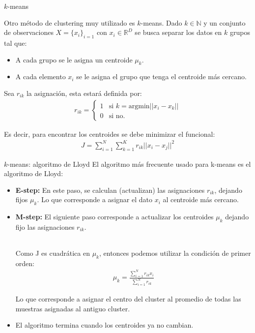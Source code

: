 \documentclass[9pt]{beamer}
\begin{document}
\begin{frame}{$k$-means}

Otro método de clustering muy utilizado es $k$-means. Dado $k \in \mathbb{N}$ y un conjunto de observaciones $X = \{x_i\}_{i=1}$ con $x_i\in \mathbb{R}^D$ se busca separar los datos en $k$ grupos tal que:

\begin{itemize}
	\item A cada grupo se le asigna un centroide $\mu_k$.\pause
	\item A cada elemento $x_i$ se le asigna el grupo que tenga el centroide más cercano.\pause
\end{itemize}

Sea $r_{ik}$ la asignación, esta estará definida por:
\begin{align*}
r_{ik} = \begin{cases}
1 & \text{si } k = \text{argmin}||x_i-x_k||\\
0 & \text{si no.}
\end{cases}
\end{align*}

\pause
Es decir, para encontrar los centroides se debe minimizar el funcional:
\begin{align*}
J = \sum_{i=1}^N \sum_{k=1}^K r_{ik} ||x_i-x_j||^2
\end{align*}
	
\end{frame}

\begin{frame}{$k$-means: algoritmo de Lloyd}
	El algoritmo más frecuente usado para k-means es el algoritmo de Lloyd:\pause

\begin{itemize}
    \item \textbf{E-step:} En este paso, se calculan (actualizan) las asignaciones $r_{ik}$, dejando fijos $\mu_k$. Lo que corresponde a asignar el dato $x_i$ al centroide más cercano.\pause
    \item \textbf{M-step:} El siguiente paso corresponde a actualizar los centroides $\mu_k$ dejando fijo las asignaciones $r_{ik}$.\\~\
    \pause
    
    Como J es cuadrática en $\mu_k$, entonces podemos utilizar la condición de primer orden:
    \begin{align*}
        \mu_k = \frac{\sum_{i=1}^N r_{ik}x_i}{\sum_{i=1}^N r_{ik}}
    \end{align*}
    
    Lo que corresponde a asignar el centro del cluster al promedio de todas las muestras asignadas al antiguo cluster.
    \pause
    \item El algoritmo termina cuando los centroides ya no cambian.
\end{itemize}

\end{frame}
\end{document}
